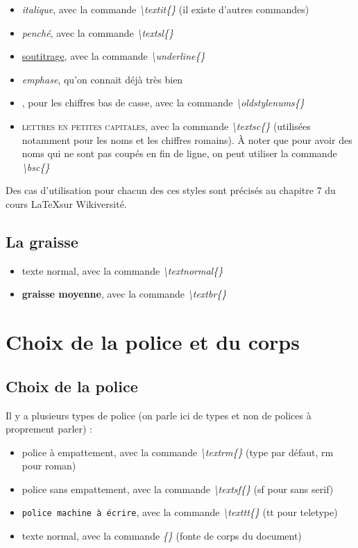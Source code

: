 \documentclass[a4paper, 10pt]{book}
\begin{document}
\begin{itemize}
\item \textit{italique}, avec la commande \textit{\textbackslash textit\{\}} (il existe d'autres commandes)
\item \textsl{penché}, avec la commande \textit{\textbackslash textsl\{\}}
\item \underline{soutitrage}, avec la commande \textit{\textbackslash underline\{\}}
\item \emph{emphase}, qu'on connait déjà très bien
\item {}, pour les chiffres bas de casse, avec la commande \textit{\textbackslash oldstylenums\{\}}
\item \textsc{lettres en petites capitales}, avec la commande \textit{\textbackslash textsc\{\}} (utilisées notamment pour les noms et les chiffres romains). À noter que pour avoir des noms qui ne sont pas coupés en fin de ligne, on peut utiliser la commande \textit{\textbackslash bsc\{\}}
\end{itemize}

Des cas d'utilisation pour chacun des ces styles sont précisés au chapitre 7 du cours \LaTeX sur Wikiversité.

\subsection{La graisse}

\begin{itemize}
\item \textnormal{texte normal}, avec la commande \textit{\textbackslash textnormal\{\}}
\item \textbf{graisse moyenne}, avec la commande \textit{\textbackslash textbr\{\}}
\end{itemize}

\pagebreak

\section{Choix de la police et du corps}
\subsection{Choix de la police}
Il y a plusieurs types de police (on parle ici de types et non de polices à proprement parler) :

\begin{itemize}
\item \textrm{police à empattement}, avec la commande \textit{\textbackslash  textrm\{\}} (type par défaut, rm pour roman)
\item \textsf{police sans empattement}, avec la commande \textit{\textbackslash textsf\{\}} (sf pour sans serif)
\item \texttt{police machine à écrire}, avec la commande \textit{\textbackslash texttt\{\}} (tt pour teletype)
\item \textnormal{texte normal}, avec la commande \textit{\textnormal\{\}} (fonte de corps du document) \\
\end{itemize}
\end{document}
